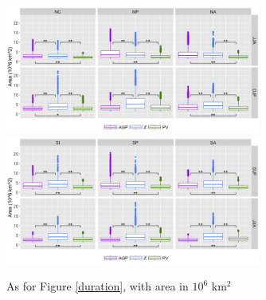 \documentclass[smallextended]{svjour3}       %
\numberwithin{equation}{section}
\begin{document}

\begin{figure}
    \centering
    \includegraphics[width=0.75\textwidth]{fig_area_NH.png}
    \includegraphics[width=0.75\textwidth]{fig_area_SH.png}
    \caption{As for Figure \ref{duration}, with area in $10^6$ km$^2$}
    \label{size}
\end{figure} 

\end{document}
